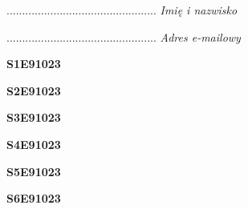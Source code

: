 \begin{turn}{90}\begin{minipage}{\linewidth} \vspace{20mm} ................................................  \textit{Imię i nazwisko}\end{minipage}\end{turn}

\begin{turn}{90}\begin{minipage}{\linewidth} \vspace{20mm} ................................................  \textit{Adres e-mailowy}\end{minipage}\end{turn}

\begin{turn}{90}\huge \begin{minipage}{\linewidth} \vspace{10mm}\textbf{S1E91023}\end{minipage}\end{turn}

\begin{turn}{90}\huge \begin{minipage}{\linewidth} \vspace{10mm}\textbf{S2E91023}\end{minipage}\end{turn}

\begin{turn}{90}\huge \begin{minipage}{\linewidth} \vspace{10mm}\textbf{S3E91023}\end{minipage}\end{turn}

\begin{turn}{90}\huge \begin{minipage}{\linewidth} \vspace{10mm}\textbf{S4E91023}\end{minipage}\end{turn}

\begin{turn}{90}\huge \begin{minipage}{\linewidth} \vspace{10mm}\textbf{S5E91023}\end{minipage}\end{turn}

\begin{turn}{90}\huge \begin{minipage}{\linewidth} \vspace{10mm}\textbf{S6E91023}\end{minipage}\end{turn}

